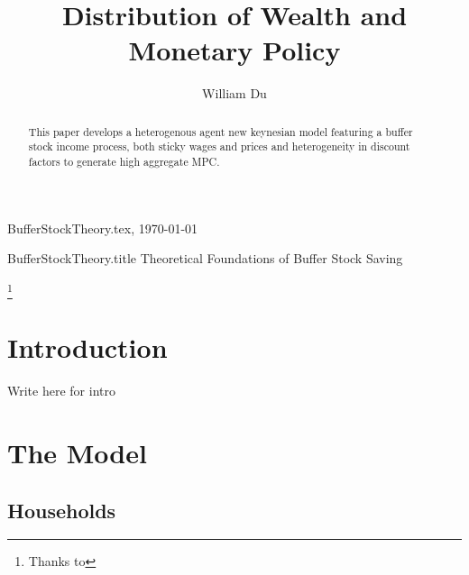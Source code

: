 \documentclass[titlepage]{\econtex}\providecommand{\texname}{BufferStockTheory}
\providecommand{\onlyinsubfile}{}
\providecommand{\notinsubfile}{}
\renewcommand{\onlyinsubfile}[1]{}
\renewcommand{\notinsubfile}[1]{#1}
\begin{document}

\renewcommand{\onlyinsubfile}[1]{}\renewcommand{\notinsubfile}[1]{#1} 

\hfill{\tiny \texname.tex, \today}

\begin{verbatimwrite}{\texname.title}
Theoretical Foundations of Buffer Stock Saving
\end{verbatimwrite}


\title{Distribution of Wealth and Monetary Policy}

\author{William Du\authNum}





\maketitle 


\hypertarget{abstract}{}
\begin{abstract}
  This paper develops a heterogenous agent new keynesian model featuring a buffer stock income process, both sticky wages and prices and heterogeneity in discount factors to generate high aggregate MPC.
\end{abstract}


\begin{authorsinfo}
\end{authorsinfo}

\thanks{Thanks to }

\titlepagefinish


\newtheorem{defn}{Definition}
\newtheorem{theorem}{Theorem}

\hypertarget{Introduction}{}
\section{Introduction}

\label{sec:intro}


Write here for intro



\hypertarget{The-Model}{}
\section{The Model}

\subsection{Households}
\label{subsec:Households} 
\end{document}
